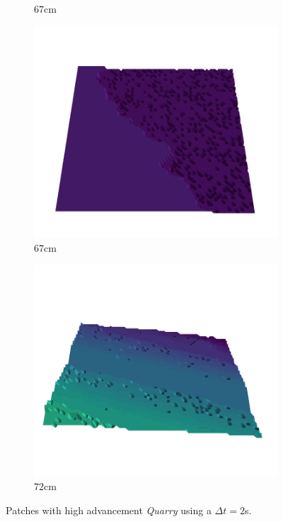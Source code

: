 \documentclass[../document.tex]{subfiles}
\begin{document}
\begin{figure}[htbp]
\begin{subfigure}[b]{0.19\textwidth}
    \caption{$67$cm}
    \end{subfigure}
    \begin{subfigure}[b]{0.19\textwidth}
    \includegraphics[width=\linewidth]{../img/5/quarry/all/best/67-patch-3d-majavi-colormap-8.png}
    \caption{$67$cm}
    \end{subfigure}
    \begin{subfigure}[b]{0.19\textwidth}
    \includegraphics[width=\linewidth]{../img/5/quarry/all/best/72-patch-3d-majavi-colormap-9.png}
    \caption{$72$cm}
    \end{subfigure}
    \caption{Patches with high advancement \emph{Quarry} using a $\Delta t = 2$s.}
\end{figure}
\end{document}

